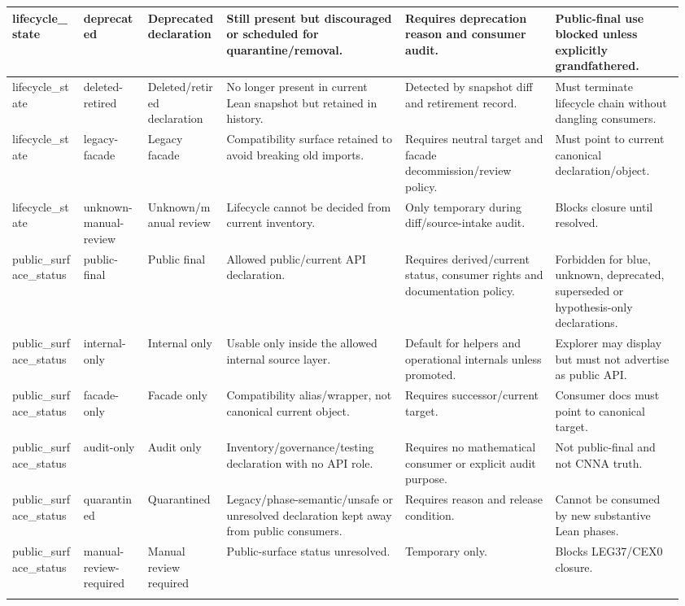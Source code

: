 \begin{longtable}{L{0.105\linewidth} L{0.095\linewidth} L{0.11\linewidth} L{0.255\linewidth} L{0.215\linewidth} L{0.185\linewidth}}
\hline
\addlinespace[0.24em]
lifecycle\_state & deprecated & Deprecated declaration & Still present but discouraged or scheduled for quarantine/\allowbreak{}removal. & Requires deprecation reason and consumer audit. & Public-final use blocked unless explicitly grandfathered.\\
\hline
\addlinespace[0.24em]
lifecycle\_state & deleted-retired & Deleted/\allowbreak{}retired declaration & No longer present in current Lean snapshot but retained in history. & Detected by snapshot diff and retirement record. & Must terminate lifecycle chain without dangling consumers.\\
\hline
\addlinespace[0.24em]
lifecycle\_state & legacy-facade & Legacy facade & Compatibility surface retained to avoid breaking old imports. & Requires neutral target and facade decommission/\allowbreak{}review policy. & Must point to current canonical declaration/\allowbreak{}object.\\
\hline
\addlinespace[0.24em]
lifecycle\_state & unknown-manual-review & Unknown/\allowbreak{}manual review & Lifecycle cannot be decided from current inventory. & Only temporary during diff/\allowbreak{}source-intake audit. & Blocks closure until resolved.\\
\hline
\addlinespace[0.24em]
public\_surface\_status & public-final & Public final & Allowed public/\allowbreak{}current API declaration. & Requires derived/\allowbreak{}current status, consumer rights and documentation policy. & Forbidden for blue, unknown, deprecated, superseded or hypothesis-only declarations.\\
\hline
\addlinespace[0.24em]
public\_surface\_status & internal-only & Internal only & Usable only inside the allowed internal source layer. & Default for helpers and operational internals unless promoted. & Explorer may display but must not advertise as public API.\\
\hline
\addlinespace[0.24em]
public\_surface\_status & facade-only & Facade only & Compatibility alias/\allowbreak{}wrapper, not canonical current object. & Requires successor/\allowbreak{}current target. & Consumer docs must point to canonical target.\\
\hline
\addlinespace[0.24em]
public\_surface\_status & audit-only & Audit only & Inventory/\allowbreak{}governance/\allowbreak{}testing declaration with no API role. & Requires no mathematical consumer or explicit audit purpose. & Not public-final and not CNNA truth.\\
\hline
\addlinespace[0.24em]
public\_surface\_status & quarantined & Quarantined & Legacy/\allowbreak{}phase-semantic/\allowbreak{}unsafe or unresolved declaration kept away from public consumers. & Requires reason and release condition. & Cannot be consumed by new substantive Lean phases.\\
\hline
\addlinespace[0.24em]
public\_surface\_status & manual-review-required & Manual review required & Public-surface status unresolved. & Temporary only. & Blocks LEG37/\allowbreak{}CEX0 closure.\\
\hline
\addlinespace[0.24em]
\end{longtable}
\normalsize
